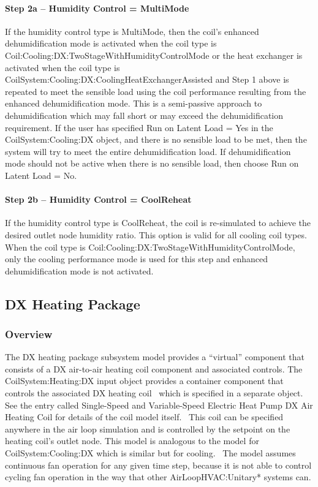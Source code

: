 \paragraph{Step 2a -- Humidity Control = MultiMode}\label{step-2a-humidity-control-multimode-1}

If the humidity control type is MultiMode, then the coil's enhanced dehumidification mode is activated when the coil type is Coil:Cooling:DX:TwoStageWithHumidityControlMode or the heat exchanger is activated when the coil type is \\
CoilSystem:Cooling:DX:CoolingHeatExchangerAssisted and Step 1 above is repeated to meet the sensible load using the coil performance resulting from the enhanced dehumidification mode. This is a semi-passive approach to dehumidification which may fall short or may exceed the dehumidification requirement. If the user has specified Run on Latent Load = Yes in the CoilSystem:Cooling:DX object, and there is no sensible load to be met, then the system will try to meet the entire dehumidification load. If dehumidification mode should not be active when there is no sensible load, then choose Run on Latent Load = No.

\paragraph{Step 2b -- Humidity Control = CoolReheat}\label{step-2b-humidity-control-coolreheat-1}

If the humidity control type is CoolReheat, the coil is re-simulated to achieve the desired outlet node humidity ratio. This option is valid for all cooling coil types. When the coil type is Coil:Cooling:DX:TwoStageWithHumidityControlMode, only the cooling performance mode is used for this step and enhanced dehumidification mode is not activated.

\subsection{DX Heating Package}\label{dx-heating-package}

\subsubsection{Overview}\label{overview-6}

The DX heating package subsystem model provides a ``virtual'' component that consists of a DX air-to-air heating coil component and associated controls. The CoilSystem:Heating:DX input object provides a container component that controls the associated DX heating coil~ which is specified in a separate object. See the entry called Single-Speed and Variable-Speed Electric Heat Pump DX Air Heating Coil for details of the coil model itself.~ This coil can be specified anywhere in the air loop simulation and is controlled by the setpoint on the heating coil's outlet node. This model is analogous to the model for CoilSystem:Cooling:DX which is similar but for cooling.~ The model assumes continuous fan operation for any given time step, because it is not able to control cycling fan operation in the way that other AirLoopHVAC:Unitary* systems can.

